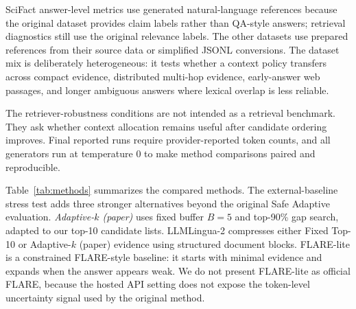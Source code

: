 \documentclass[11pt]{article}
\begin{document}
\begin{table}[t]
\centering
\small
\caption{Datasets used in the evaluation. The split is fixed across methods so token and answer-quality comparisons are paired by query.}
\label{tab:datasets}
\end{table}

SciFact answer-level metrics use generated natural-language references because the original dataset provides claim labels rather than QA-style answers; retrieval diagnostics still use the original relevance labels. The other datasets use prepared references from their source data or simplified JSONL conversions. The dataset mix is deliberately heterogeneous: it tests whether a context policy transfers across compact evidence, distributed multi-hop evidence, early-answer web passages, and longer ambiguous answers where lexical overlap is less reliable.

The retriever-robustness conditions are not intended as a retrieval benchmark. They ask whether context allocation remains useful after candidate ordering improves. Final reported runs require provider-reported token counts, and all generators run at temperature 0 to make method comparisons paired and reproducible.

Table~\ref{tab:methods} summarizes the compared methods. The external-baseline stress test adds three stronger alternatives beyond the original Safe Adaptive evaluation. \emph{Adaptive-$k$ (paper)} uses fixed buffer $B=5$ and top-90\% gap search, adapted to our top-10 candidate lists. LLMLingua-2 compresses either Fixed Top-10 or Adaptive-$k$ (paper) evidence using structured document blocks. FLARE-lite is a constrained FLARE-style baseline: it starts with minimal evidence and expands when the answer appears weak. We do not present FLARE-lite as official FLARE, because the hosted API setting does not expose the token-level uncertainty signal used by the original method.
\end{document}
